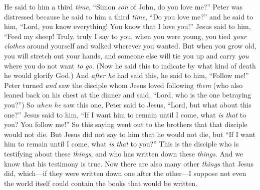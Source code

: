 \begin{biblechapter}
\verse He said to him a third \textit{time}, “Simon \textit{son} of John, do you love me?” Peter was distressed because he said to him a third \textit{time}, “Do you love me?” and he said to him, “Lord, you know everything! You know that I love you!” Jesus said to him, “Feed my sheep!
\verse Truly, truly I say to you, when you were young, you tied \textit{your clothes} around yourself and walked wherever you wanted. But when you grow old, you will stretch out your hands, and someone else will tie you up and carry \textit{you} where you do not want \textit{to go}.
\verse (Now he said this to indicate by what kind of death he would glorify God.) And \textit{after he} had said this, he said to him, “Follow me!”
 Peter turned \textit{and} saw the disciple whom Jesus loved following \textit{them} (who also leaned back on his chest at the dinner and said, “Lord, who is the one betraying you?”)
\verse So \textit{when he} saw this one, Peter said to Jesus, “Lord, but what about this one?”
\verse Jesus said to him, “If I want him to remain until I come, what \textit{is that} to you? You follow me!”
\verse So this saying went out to the brothers that that disciple would not die. But Jesus did not say to him that he would not die, but “If I want him to remain until I come, what \textit{is that} to you?”
 This is the disciple who is testifying about these \textit{things}, and who has written down these \textit{things}. And we know that his testimony is true.
\verse Now there are also many other \textit{things} that Jesus did, which—if they were written down one after the other—I suppose not even the world itself could contain the books that would be written.
\end{biblechapter}

